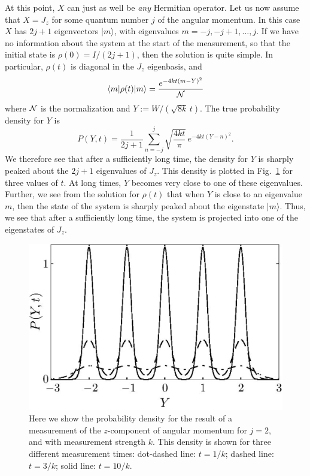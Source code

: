 \documentclass[aps,twocolumn,superscriptaddress,footinbib,floatfix,showpacs]{revtex4}
\begin{document}
At this point, $X$ can just as well be \textit{any} Hermitian operator. Let us now assume
that $X = J_z$ for some quantum number $j$ of the angular momentum. In this
case $X$ has $2j + 1$ eigenvectors $|m\rangle$, with
eigenvalues $m = -j,-j+1, \ldots, j$. If 
we have no information about the system
at the start of the measurement,
so that the
initial state is $\rho(0) = I/(2j+1)$, then the solution is quite
simple. In particular, $\rho(t)$ is diagonal in the $J_z$
eigenbasis, and
\begin{equation}
  \langle m |\rho(t)| m \rangle = \frac{e^{-4kt(m-Y)^2}}{\cal N}
\end{equation}
where ${\cal N}$ is the normalization and 
$Y:=W/(\sqrt{8k}\,t)$. The true probability density for $Y$ is
\begin{equation}
  P(Y,t) = \frac{1}{2j+1}\sum_{n=-j}^j \sqrt{\frac{4kt}{\pi}}\,e^{-4kt(Y-n)^2} .
\end{equation}
We therefore see that after a sufficiently long time, the density
for $Y$ is sharply peaked about the $2j+1$ eigenvalues of $J_z$. 
This density is plotted in Fig.~\ref{fig:msolution} for three values of $t$.
At long times, $Y$ becomes very close to one of these
eigenvalues. Further, we see from the solution for $\rho(t)$ that
when $Y$ is close to an eigenvalue $m$, then the state of the
system is sharply peaked about the eigenstate $|m\rangle$. Thus, we
see that after a sufficiently long time, the system is projected
into one of the eigenstates of $J_z$.

\begin{figure}[tb]
  \begin{center}
     \includegraphics[width=1.0\hsize]{jcpfig1_mod.bmap.250.eps}
  \end{center}
  \vspace{-5mm}
  \caption
         {Here we show the probability density for the result of a measurement 
          of the $z$-component of angular momentum for $j=2$, and with 
          measurement strength $k$. This density 
          is shown for three different measurement times: dot-dashed line: $t = 1/k$; 
          dashed line: $t=3/k$; solid line: $t = 10/k$. 
	\label{fig:msolution}}
\end{figure}
\end{document}
